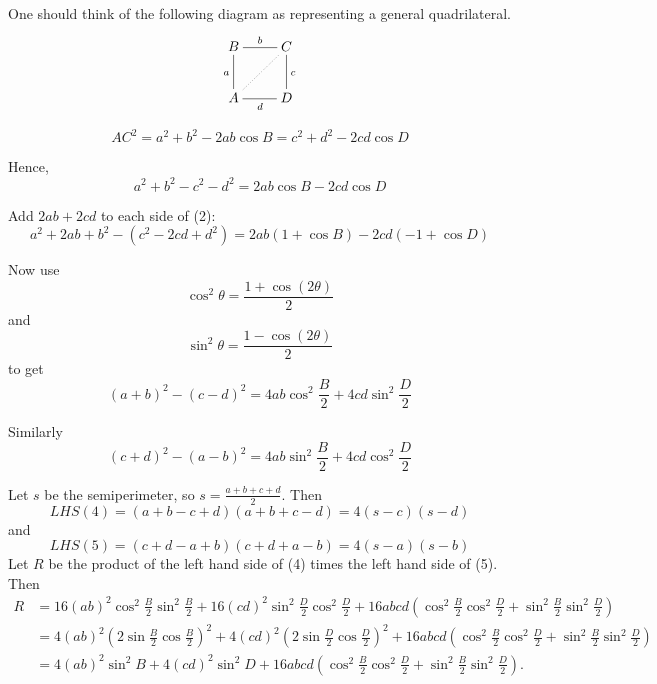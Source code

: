 \documentclass[12pt]{article}
\begin{document}
One should think of the following diagram as representing a general quadrilateral.
\begin{displaymath}
\xymatrix{
  B \ar@{-}[r]^b\ar@{-}[d]_a & C\ar@{-}[d]^c\ar@{.}[dl] \\
  A \ar@{-}[r]_d & D }
\end{displaymath}


\begin{equation}
AC^2 = a^2 + b^2 -2ab\cos B = c^2 + d^2 - 2cd \cos D
\end{equation}

Hence,
\begin{equation}
a^2 + b^2 - c^2 -d^2 = 2ab \cos B -2cd \cos D
\end{equation}

Add $2ab + 2cd$ to each side of (2):
\begin{equation}
a^2 + 2ab + b^2 - (c^2 - 2cd+d^2) = 2ab ( 1 + \cos B ) - 2cd(-1 + \cos D)
\end{equation}

Now use
$$
\cos^2 \theta = \frac{1+\cos (2\theta)}{ 2}
$$
and
$$
\sin^2 \theta = \frac{1 - \cos(2\theta)} { 2}
$$
to get
\begin{equation}
(a+b)^2 - (c-d)^2 = 4ab \cos^2 \frac{B}{2} + 4 cd \sin^2 \frac{D}{2}
\end{equation}
 
Similarly
\begin{equation}
(c+d)^2 - (a-b)^2 = 4ab \sin^2 \frac{B}{2} + 4 cd \cos^2 \frac{D}{2}
\end{equation}

Let $s$ be the semiperimeter, so $s = \frac{a+b+c+d}{2}$.
Then 
\begin{equation}
LHS(4) = (a+b-c+d)(a+b+c-d) = 4(s-c)(s-d)
\end{equation}
and
\begin{equation}
LHS(5) = (c+d-a+b)(c+d+a-b) = 4(s-a)(s-b)
\end{equation}
Let $R$ be the product of 
the left hand side of (4) times the left hand side of (5). Then
\begin{align}
R &= 16(ab)^2\cos^2\frac{B}{2}\sin^2\frac{B}{2} + 16(cd)^2\sin^2\frac{D}{2}\cos^2\frac{D}{2} 
+ 16abcd(\cos^2\frac{B}{2} \cos^2\frac{D}{2} + \sin^2\frac{B}{2}\sin^2\frac{D}{2}) \\
& = 4(ab)^2(2\sin\frac{B}{2}\cos\frac{B}{2})^2 + 4(cd)^2(2\sin\frac{D}{2}\cos\frac{D}{2})^2
+ 16abcd(\cos^2\frac{B}{2}\cos^2\frac{D}{2} + \sin^2\frac{B}{2}\sin^2\frac{D}{2}) \\
& = 4(ab)^2\sin^2B + 4(cd)^2\sin^2D +16abcd(\cos^2\frac{B}{2}\cos^2\frac{D}{2} +
 \sin^2\frac{B}{2}\sin^2\frac{D}{2}).
\end{align}
\end{document}
